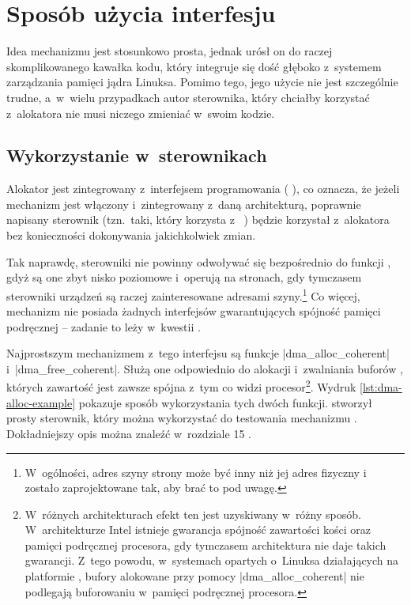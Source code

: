 \chapter{Sposób użycia interfesju }\label{sec:cma-usage}

Idea mechanizmu  jest stosunkowo prosta, jednak urósł on do raczej
skomplikowanego kawałka kodu, który integruje się dość głęboko
z~systemem zarządzania pamięci jądra Linuksa.  Pomimo tego, jego
użycie nie jest szczególnie trudne, a~w~wielu przypadkach autor
sterownika, który chciałby korzystać z~alokatora  nie musi niczego
zmieniać w~swoim kodzie.

\section{Wykorzystanie w~sterownikach}\label{sec:usage-drivers}

Alokator  jest zintegrowany z~interfejsem programowania
 ( ), co oznacza, że jeżeli mechanizm
 jest włączony i~zintegrowany z~daną architekturą, poprawnie
napisany sterownik (tzn.\ taki, który korzysta z~ )
będzie korzystał z~alokatora  bez konieczności dokonywania
jakichkolwiek zmian.

Tak naprawdę, sterowniki nie powinny odwoływać się bezpośrednio do
funkcji , gdyż są one zbyt nisko poziomowe i~operują na stronach,
gdy tymczasem sterowniki urządzeń są raczej zainteresowane adresami
szyny.\footnote{W~ogólności, adres szyny strony może być inny niż jej
  adres fizyczny i~  zostało zaprojektowane tak, aby brać to pod
  uwagę.}  Co więcej, mechanizm  nie posiada żadnych interfejsów
gwarantujących spójność pamięci podręcznej -- zadanie to leży
w~kwestii  .

Najprostszym mechanizmem z~tego interfejsu są funkcje
\code|dma_alloc_coherent| i~\code|dma_free_coherent|.  Służą one
odpowiednio do alokacji i~zwalniania buforów , których zawartość
jest zawsze spójna z~tym co widzi procesor\footnote{W~różnych
  architekturach efekt ten jest uzyskiwany w~różny sposób.
  W~architekturze Intel istnieje gwarancja spójność zawartości kości
   oraz pamięci podręcznej procesora, gdy tymczasem architektura
   nie daje takich gwarancji.  Z~tego powodu, w~systemach opartych
  o~Linuksa działających na platformie , bufory alokowane przy
  pomocy \code|dma_alloc_coherent| nie podlegają buforowaniu w~pamięci
  podręcznej procesora.}.  Wydruk \ref{lst:dma-alloc-example} pokazuje
sposób wykorzystania tych dwóch funkcji.  \textcite{patch:cma-test}
stworzył prosty sterownik, który można wykorzystać do testowania
mechanizmu .  Dokładniejszy opis   można znaleźć w~rozdziale
15 \autocite{bib:ldd3}.

